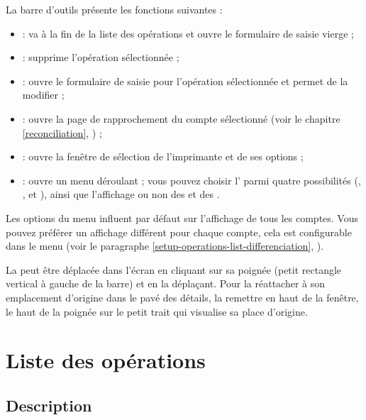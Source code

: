 La barre d'outils présente les fonctions suivantes  : 

\begin{itemize}
	 \item {} : va à la fin de la liste des opérations et ouvre le formulaire de saisie vierge ;
	 \item {} : supprime l'opération sélectionnée ;
	 \item {} : ouvre le formulaire de saisie pour l'opération sélectionnée et permet de la modifier ;
	 \item {} : ouvre la page de rapprochement du compte sélectionné (voir le chapitre \vref{reconciliation}, ) ;
	 \item {} : ouvre la fenêtre de sélection de l'imprimante et de ses
	options ;
	 \item {} : ouvre un menu déroulant ; vous pouvez choisir l' parmi quatre possibilités (, ,  et ), ainsi que l'affichage ou non des  et des .
\end{itemize}

Les options du menu  influent par défaut sur l'affichage de tous les comptes. Vous pouvez préférer un affichage différent pour chaque compte, cela est configurable dans le menu   (voir le paragraphe \vref{setup-operations-list-differenciation}, ).
 
La  peut être déplacée dans l'écran en cliquant sur sa poignée (petit rectangle vertical à gauche de la barre) et en la déplaçant. Pour la réattacher à son emplacement d'origine dans le pavé des détails, la remettre en haut de la fenêtre, le haut de la poignée sur le petit trait qui visualise sa place d'origine.


\section{Liste des opérations\label{transactions-list}}


\subsection{Description\label{transactions-list-description}}

